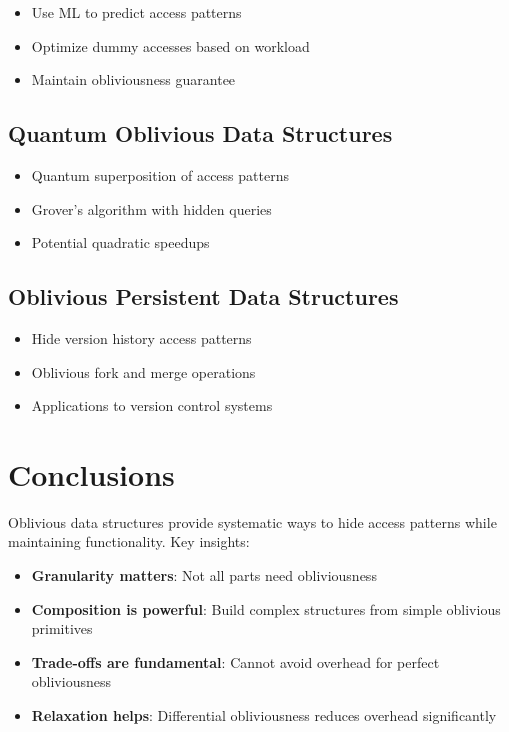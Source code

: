 \documentclass[11pt,final]{article}
\begin{document}
\begin{itemize}
    \item Use ML to predict access patterns
    \item Optimize dummy accesses based on workload
    \item Maintain obliviousness guarantee
\end{itemize}

\subsection{Quantum Oblivious Data Structures}

\begin{itemize}
    \item Quantum superposition of access patterns
    \item Grover's algorithm with hidden queries
    \item Potential quadratic speedups
\end{itemize}

\subsection{Oblivious Persistent Data Structures}

\begin{itemize}
    \item Hide version history access patterns
    \item Oblivious fork and merge operations
    \item Applications to version control systems
\end{itemize}

\section{Conclusions}

Oblivious data structures provide systematic ways to hide access patterns while maintaining functionality. Key insights:

\begin{itemize}
    \item \textbf{Granularity matters}: Not all parts need obliviousness
    \item \textbf{Composition is powerful}: Build complex structures from simple oblivious primitives
    \item \textbf{Trade-offs are fundamental}: Cannot avoid overhead for perfect obliviousness
    \item \textbf{Relaxation helps}: Differential obliviousness reduces overhead significantly
\end{itemize}
\end{document}
